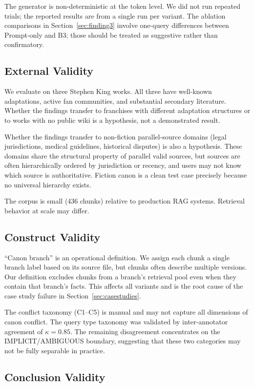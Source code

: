 \documentclass[conference]{IEEEtran}
\begin{document}
The generator is non-deterministic at the token level. We did not run repeated trials; the reported results are from a single run per variant. The ablation comparisons in Section~\ref{sec:finding3} involve one-query differences between Prompt-only and B3; those should be treated as suggestive rather than confirmatory.

\subsection{External Validity}

We evaluate on three Stephen King works. All three have well-known adaptations, active fan communities, and substantial secondary literature. Whether the findings transfer to franchises with different adaptation structures or to works with no public wiki is a hypothesis, not a demonstrated result.

Whether the findings transfer to non-fiction parallel-source domains (legal jurisdictions, medical guidelines, historical disputes) is also a hypothesis. These domains share the structural property of parallel valid sources, but sources are often hierarchically ordered by jurisdiction or recency, and users may not know which source is authoritative. Fiction canon is a clean test case precisely because no universal hierarchy exists.

The corpus is small (436 chunks) relative to production RAG systems. Retrieval behavior at scale may differ.

\subsection{Construct Validity}

``Canon branch'' is an operational definition. We assign each chunk a single branch label based on its source file, but chunks often describe multiple versions. Our definition excludes chunks from a branch's retrieval pool even when they contain that branch's facts. This affects all variants and is the root cause of the case study failure in Section~\ref{sec:casestudies}.

The conflict taxonomy (C1--C5) is manual and may not capture all dimensions of canon conflict. The query type taxonomy was validated by inter-annotator agreement of $\kappa = 0.85$. The remaining disagreement concentrates on the IMPLICIT/AMBIGUOUS boundary, suggesting that these two categories may not be fully separable in practice.

\subsection{Conclusion Validity}
\end{document}
